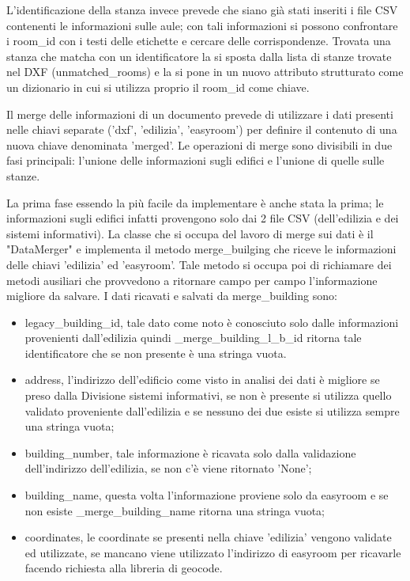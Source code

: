 \documentclass[12pt]{report}
\begin{document}
L'identificazione della stanza invece prevede che siano già stati inseriti i file CSV contenenti le informazioni sulle aule; con tali informazioni si possono confrontare i room\_id con i testi delle etichette e cercare delle corrispondenze.
Trovata una stanza che matcha con un identificatore la si sposta dalla lista di stanze trovate nel DXF (unmatched\_rooms) e la si pone in un nuovo attributo strutturato come un dizionario in cui si utilizza proprio il room\_id come chiave. 

\vspace{5mm} %

Il merge delle informazioni di un documento prevede di utilizzare i dati presenti nelle chiavi separate ('dxf', 'edilizia', 'easyroom') per definire il contenuto di una nuova chiave denominata 'merged'.
Le operazioni di merge sono divisibili in due fasi principali: l'unione delle informazioni sugli edifici e l'unione di quelle sulle stanze.

La prima fase essendo la più facile da implementare è anche stata la prima; le informazioni sugli edifici infatti provengono solo dai 2 file CSV (dell'edilizia e dei sistemi informativi).
La classe che si occupa del lavoro di merge sui dati è il "DataMerger" e implementa il metodo merge\_builging che riceve le informazioni delle chiavi 'edilizia' ed 'easyroom'. Tale metodo si occupa poi di richiamare dei metodi ausiliari che provvedono a ritornare campo per campo l'informazione migliore da salvare. I dati ricavati e salvati da merge\_building sono:
\begin{itemize}
\item legacy\_building\_id, tale dato come noto è conosciuto solo dalle informazioni provenienti dall'edilizia quindi \_merge\_building\_l\_b\_id ritorna tale identificatore che se non presente è una stringa vuota.
\item address, l'indirizzo dell'edificio come visto in analisi dei dati è migliore se preso dalla Divisione sistemi informativi, se non è presente si utilizza quello validato proveniente dall'edilizia e se nessuno dei due esiste si utilizza sempre una stringa vuota;
\item building\_number, tale informazione è ricavata solo dalla validazione dell'indirizzo dell'edilizia, se non c'è viene ritornato 'None';
\item building\_name, questa volta l'informazione proviene solo da easyroom e se non esiste \_merge\_building\_name ritorna una stringa vuota;
\item coordinates, le coordinate se presenti nella chiave 'edilizia' vengono validate ed utilizzate, se mancano viene utilizzato l'indirizzo di easyroom per ricavarle facendo richiesta alla libreria di geocode. 
\end{itemize}
\end{document}

